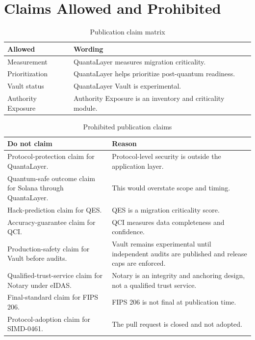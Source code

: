 \documentclass[11pt,a4paper,oneside,parskip=false]{scrartcl}
\newcommand{\QES}{\textsc{QES}}
\newcommand{\QCI}{\textsc{QCI}}
\begin{document}
\nocite{*}
\printbibliography[heading=bibintoc,title={References}]

\appendix

\section{Claims Allowed and Prohibited}
\label{appendix:claims}

\begin{table}[htbp]
\centering
\caption{Publication claim matrix}
\label{tab:claim-matrix}
\small
\begin{tabularx}{\textwidth}{L{0.20\textwidth}Y}
\toprule
\textbf{Allowed} & \textbf{Wording} \\
\midrule
Measurement & QuantaLayer measures migration criticality. \\
Prioritization & QuantaLayer helps prioritize post-quantum readiness. \\
Vault status & QuantaLayer Vault is experimental. \\
Authority Exposure & Authority Exposure is an inventory and criticality module. \\
\bottomrule
\end{tabularx}
\end{table}

\begin{table}[htbp]
\centering
\caption{Prohibited publication claims}
\label{tab:prohibited-claims}
\small
\begin{tabularx}{\textwidth}{L{0.32\textwidth}Y}
\toprule
\textbf{Do not claim} & \textbf{Reason} \\
\midrule
Protocol-protection claim for QuantaLayer. & Protocol-level security is outside the application layer. \\
Quantum-safe outcome claim for Solana through QuantaLayer. & This would overstate scope and timing. \\
Hack-prediction claim for \QES{}. & \QES{} is a migration criticality score. \\
Accuracy-guarantee claim for \QCI{}. & \QCI{} measures data completeness and confidence. \\
Production-safety claim for Vault before audits. & Vault remains experimental until independent audits are published and release caps are enforced. \\
Qualified-trust-service claim for Notary under eIDAS. & Notary is an integrity and anchoring design, not a qualified trust service. \\
Final-standard claim for FIPS 206. & FIPS 206 is not final at publication time. \\
Protocol-adoption claim for SIMD-0461. & The pull request is closed and not adopted. \\
\bottomrule
\end{tabularx}
\end{table}
\end{document}
